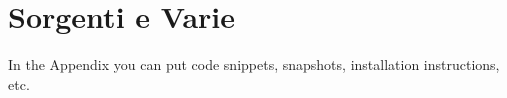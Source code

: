 
\chapter{Sorgenti e Varie} \label{appendice_Codice}
  

In the Appendix you can put code snippets, snapshots, installation instructions, etc.
